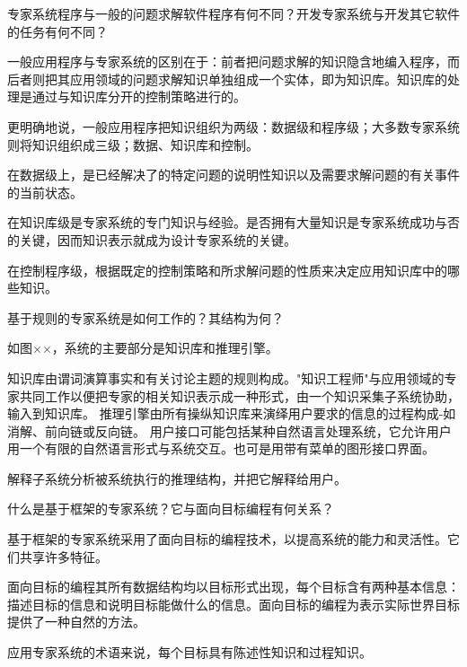 \begin{question}
专家系统程序与一般的问题求解软件程序有何不同？开发专家系统与开发其它软件的任务有何不同？
\end{question}
\begin{solution}
一般应用程序与专家系统的区别在于：前者把问题求解的知识隐含地编入程序，而后者则把其应用领域的问题求解知识单独组成一个实体，即为知识库。知识库的处理是通过与知识库分开的控制策略进行的。\par
更明确地说，一般应用程序把知识组织为两级：数据级和程序级；大多数专家系统则将知识组织成三级；数据、知识库和控制。\par
在数据级上，是已经解决了的特定问题的说明性知识以及需要求解问题的有关事件的当前状态。\par
在知识库级是专家系统的专门知识与经验。是否拥有大量知识是专家系统成功与否的关键，因而知识表示就成为设计专家系统的关键。\par
在控制程序级，根据既定的控制策略和所求解问题的性质来决定应用知识库中的哪些知识。
\end{solution}

\begin{question}
基于规则的专家系统是如何工作的？其结构为何？
\end{question}
\begin{solution}
\end{solution}
如图××，系统的主要部分是知识库和推理引擎。\par
知识库由谓词演算事实和有关讨论主题的规则构成。"知识工程师"与应用领域的专家共同工作以便把专家的相关知识表示成一种形式，由一个知识采集子系统协助，输入到知识库。 推理引擎由所有操纵知识库来演绎用户要求的信息的过程构成-如消解、前向链或反向链。 用户接口可能包括某种自然语言处理系统，它允许用户用一个有限的自然语言形式与系统交互。也可是用带有菜单的图形接口界面。\par
解释子系统分析被系统执行的推理结构，并把它解释给用户。
\begin{question}
\end{question}
\begin{solution}
\end{solution}

\begin{question}
什么是基于框架的专家系统？它与面向目标编程有何关系？
\end{question}
\begin{solution}
基于框架的专家系统采用了面向目标的编程技术，以提高系统的能力和灵活性。它们共享许多特征。\par
面向目标的编程其所有数据结构均以目标形式出现，每个目标含有两种基本信息：描述目标的信息和说明目标能做什么的信息。面向目标的编程为表示实际世界目标提供了一种自然的方法。\par
应用专家系统的术语来说，每个目标具有陈述性知识和过程知识。 
\end{solution}

